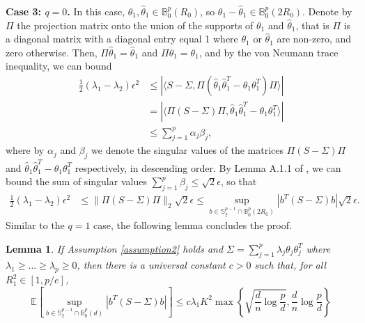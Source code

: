 \documentclass[11pt]{article}
\newtheorem{lemma}[theorem]{Lemma}
\newcommand{\E}{\mathbb{E}}
\newcommand{\B}{\mathbb{B}}
\begin{document}
\textbf{Case 3: $q=0$.} 
In this case, $\theta_1,\hat\theta_1\in\B^p_0(R_0)$, so $\theta_1 - \hat\theta_1\in \B^p_0(2R_0)$. Denote by $\Pi$ the projection matrix onto the union of the supports of $\theta_1$ and $\hat\theta_1$, that is $\Pi$ is a diagonal matrix with a diagonal entry equal 1 where $\theta_1$ or $\hat\theta_1$ are non-zero, and zero otherwise. Then, $\Pi\hat\theta_1 = \hat\theta_1$ and $\Pi\theta_1 = \theta_1$, and by the von Neumann trace inequality, we can bound
\begin{align*}
\frac{1}{2}(\lambda_1 - \lambda_2) \epsilon^2 &\le |\langle S-\Sigma, \Pi(\hat\theta_1\hat\theta_1^T - \theta_1\theta_1^T)\Pi\rangle| \\
&=|\langle \Pi(S-\Sigma)\Pi, \hat\theta_1\hat\theta_1^T - \theta_1\theta_1^T\rangle| \\
&\le \sum_{j=1}^p\alpha_j\beta_j,
\end{align*}
where by $\alpha_j$ and $\beta_j$ we denote the singular values of the matrices $\Pi(S-\Sigma)\Pi$ and $\hat\theta_1\hat\theta_1^T - \theta_1\theta_1^T$ respectively, in descending order. By Lemma A.1.1 of \citep{VL12}, we can bound the sum of singular values $\sum_{j=1}^p\beta_j \le \sqrt{2}\epsilon$, so that
\begin{align*}
\frac{1}{2}(\lambda_1 - \lambda_2) \epsilon^2 &\le \|\Pi(S-\Sigma)\Pi\|_2\sqrt{2}\epsilon \le \sup_{b\in \mathbb{S}^{p-1}_2\cap \B^p_0(2R_0)} |b^T(S-\Sigma)b|\sqrt{2}\epsilon.
\end{align*}
Similar to the $q=1$ case, the following lemma concludes the proof.
\begin{lemma}\label{lemma324}
If Assumption \ref{assumption2} holds and $\Sigma = \sum_{j=1}^p\lambda_j\theta_j\theta_j^T$ where $\lambda_1\ge \dots \ge \lambda_p \ge 0$, then there is a universal constant $c>0$ such that, for all $R_1^2\in [1, p/e]$,
\begin{equation*}
\E\left[\sup_{b\in \mathbb{S}^{p-1}_2\cap \B^p_0(d)} |b^T(S-\Sigma)b|\right] \le c\lambda_1 K^2\max\left\{\sqrt{\frac{d}{n}\log\frac{p}{d}},\frac{d}{n}\log\frac{p}{d}\right\}
\end{equation*}
\end{lemma}


\end{document}
